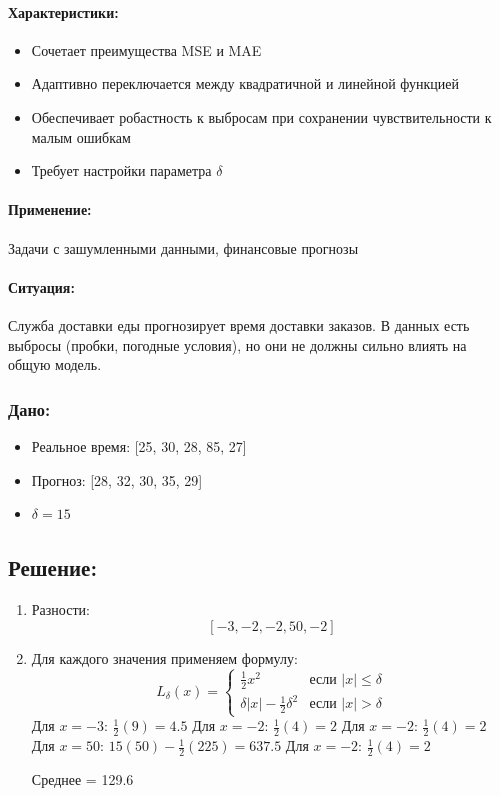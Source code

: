 \paragraph{Характеристики:}
\begin{itemize}
    \item Сочетает преимущества MSE и MAE
    \item Адаптивно переключается между квадратичной и линейной функцией
    \item Обеспечивает робастность к выбросам при сохранении чувствительности к малым ошибкам
    \item Требует настройки параметра $\delta$
\end{itemize}

\paragraph{Применение:} Задачи с зашумленными данными, финансовые прогнозы

\paragraph{Ситуация:} Служба доставки еды прогнозирует время доставки заказов. В данных есть выбросы (пробки, погодные условия), но они не должны сильно влиять на общую модель.

\subsubsection*{Дано:}
\begin{itemize}
    \item Реальное время: [25, 30, 28, 85, 27]
    \item Прогноз: [28, 32, 30, 35, 29]
    \item $\delta = 15$
\end{itemize}

\subsection*{Решение:}

\begin{enumerate}
    \item {Разности:}
          \[
              [-3, -2, -2, 50, -2]
          \]

    \item{Для каждого значения применяем формулу:}
          \[
              L_\delta(x) = \begin{cases}
                  \frac{1}{2}x^2                  & \text{если } |x| \leq \delta \\
                  \delta|x| - \frac{1}{2}\delta^2 & \text{если } |x| > \delta
              \end{cases}
          \]
          Для $x = -3$: $\frac{1}{2}(9) = 4.5$
          Для $x = -2$: $\frac{1}{2}(4) = 2$
          Для $x = -2$: $\frac{1}{2}(4) = 2$
          Для $x = 50$: $15(50) - \frac{1}{2}(225) = 637.5$
          Для $x = -2$: $\frac{1}{2}(4) = 2$

          Среднее = 129.6
\end{enumerate}

